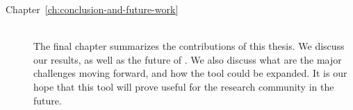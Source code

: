 \begin{description}

    \item[Chapter~\ref{ch:conclusion-and-future-work}] \hfill \\

        The final chapter summarizes the contributions of this thesis.
        We discuss our results, as well as the future of \demo. We also
        discuss what are the major challenges moving forward, and how
        the tool could be expanded. It is our hope that this tool will
        prove useful for the research community in the future.


\end{description}
